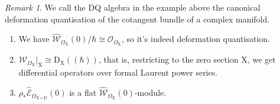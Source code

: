 \documentclass{article}
\theoremstyle{plain}
\theoremstyle{definition}
\theoremstyle{remark}
\newtheorem{remark}[theorem]{Remark}
\newcommand{\mr}{\mathrm}
\newcommand{\C}{\mathbf C}
\newcommand{\cbrak}{(\!(\hbar)\!)}
\newcommand{\3}{\vspace{3mm}}
\newcommand{\2}{\vspace{2mm}}
\newcommand{\1}{\vspace{1mm}}
\begin{document}
\2
\begin{remark}
We call the DQ algebra in the example above the canonical deformation quantisation of the cotangent bundle of a complex manifold. 
\begin{enumerate}
\item We have $\widehat{\mathscr{W}}_{\Omega_{\mr{X}}}(0)/\hbar\cong \mathscr{O}_{\Omega_\mr{X}}$, so it's indeed deformation quantisation.
\item $\widehat{\mathscr{W}}_{\Omega_\mr{X}}|_\mr{X}\cong \mr{D}_\mr{X}\cbrak$, that is, restricting to the zero section $\mr{X}$, we get differential operators over formal Laurent power series.
\item $\rho_{*}\widehat{\mathscr{E}}_{\Omega_{\mr{X}\times \C}}(0)$ is a flat $\widehat{\mathscr{W}}_{\Omega_\mr{X}}(0)$-module.
\end{enumerate}
\end{remark}
\end{document}
